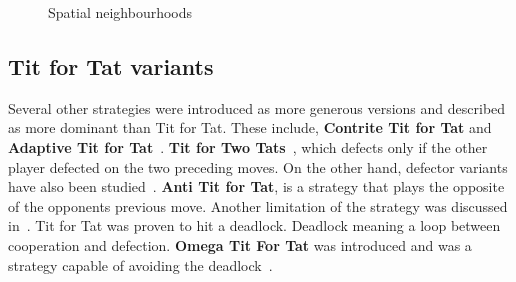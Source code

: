 \documentclass{article}
\begin{document}
\begin{figure}[!hbtp]
\centering
    \begin{subfigure}{.25\textwidth}
            
    \end{subfigure}
    \begin{subfigure}{.25\textwidth}\centering
         
     \end{subfigure}
     \begin{subfigure}{.25\textwidth}\centering
         
     \end{subfigure}
    \begin{subfigure}{.25\textwidth}
            
    \end{subfigure}
    \begin{subfigure}{.25\textwidth}\centering
         
     \end{subfigure}
     \begin{subfigure}{.25\textwidth}\centering
         
     \end{subfigure}
     \caption{Spatial neighbourhoods}\label{fig:topologies}
    \end{figure}

\subsection{Tit for Tat variants}

Several other strategies were introduced as more generous versions and 
described as more dominant than Tit for Tat. These include, \textbf{Contrite Tit for Tat}
\cite{Wu1995} and \textbf{Adaptive Tit for Tat}~\cite{tzafestas-2000a}.
\textbf{Tit for Two Tats}~\cite{axelrod1988}, which defects only if the other
player defected on the two preceding moves. On the
other hand, defector variants have also been studied~\cite{Hilde2013}.
\textbf{Anti Tit for Tat}, is a strategy that plays the opposite of the opponents
previous move. Another limitation of the strategy was discussed in~\cite{Wolfgang2006}.
Tit for Tat was proven to hit a deadlock. Deadlock meaning a loop between 
cooperation and defection. \textbf{Omega Tit For Tat} was introduced and was
a strategy capable of avoiding the deadlock~\cite{Wolfgang2006}.
\end{document}
